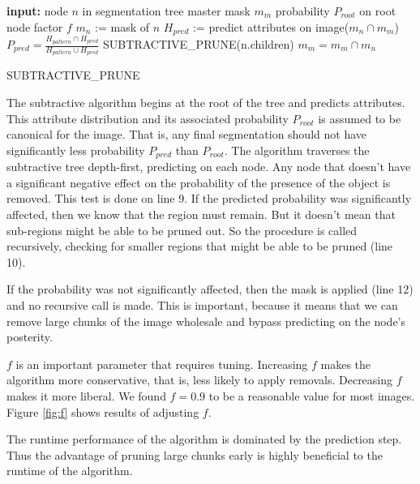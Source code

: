 \documentclass[10pt,twocolumn,letterpaper]{article}
\begin{document}
\begin{algorithm}
\begin{algorithmic}[1]
  \STATE \textbf{input:} 
  \STATE \hspace{3 mm} node $n$ in segmentation tree
  \STATE \hspace{3 mm} master mask $m_m$
  \STATE \hspace{3 mm} probability $P_{root}$ on root node
  \STATE \hspace{3 mm} factor $f$
  \STATE $m_n$ := mask of $n$
  \STATE $H_{pred}$ := predict attributes on image($m_n \cap m_m$)
  \STATE $\displaystyle P_{pred} = \frac{H_{pattern} \cap H_{pred}}{H_{pattern} \cup H_{pred}}$
    \STATE SUBTRACTIVE\_PRUNE(n.children)
  \ELSE
    \STATE $m_m = m_m \cap m_n$
  \ENDIF
\end{algorithmic}
\caption{SUBTRACTIVE\_PRUNE}
\label{alg:sub_prun}
\end{algorithm}

The subtractive algorithm begins at the root of the tree and predicts attributes.
This attribute distribution and its associated probability $P_{root}$ is assumed to be
canonical for the image.  That is, any final segmentation should not have
significantly less probability $P_{pred}$ than $P_{root}$.  The algorithm traverses
the subtractive tree depth-first, predicting on each node.  
Any node that doesn't have a significant negative effect on the probability
of the presence of the object is removed.  This test is done on line 9.  If the
predicted probability was significantly affected, then we know that the region
must remain.  But it doesn't mean that sub-regions might be able to be pruned
out.  So the procedure is called recursively, checking for smaller regions
that might be able to be pruned (line 10).

If the probability was not significantly affected, then the mask is applied
(line 12) and no recursive call is made.  This is important, because it means
that we can remove large chunks of the image wholesale and bypass predicting
on the node's posterity.

$f$ is an important parameter that requires tuning.  Increasing $f$ makes the
algorithm more conservative, that is, less likely to apply removals.  Decreasing
$f$ makes it more liberal.  We found $f=0.9$ to be a reasonable value for most images.
Figure \ref{fig:f} shows results of adjusting $f$.

The runtime performance of the algorithm is dominated by the prediction step.
Thus the advantage of pruning large chunks early is highly beneficial to 
the runtime of the algorithm.
\end{document}

